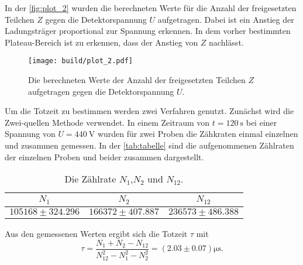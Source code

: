 In der \autoref{fig:plot_2} wurden die berechneten Werte für die Anzahl der freigesetzten Teilchen $Z$ gegen die Detektorspannung $U$
aufgetragen. Dabei ist ein Anstieg der Ladungsträger proportional zur Spannung erkennen. In dem vorher bestimmten
Plateau-Bereich ist zu erkennen, dass der Anstieg von $Z$ nachlässt.

\begin{figure}[H]
	\texttt{[image: build/plot\_2.pdf]}
	\caption{Die berechneten Werte der Anzahl der freigesetzten Teilchen $Z$ aufgetragen gegen die Detektorspannung $U$.}
	\label{fig:plot_2}
\end{figure}

Um die Totzeit zu bestimmen werden zwei Verfahren genutzt. Zunächst wird die Zwei-quellen Methode
verwendet. In einem Zeitraum von $t = \SI{120}{\second}$ bei einer Spannung von $U = \SI{440}{\volt}$ wurden für zwei Proben
die Zähkraten einmal einzelnen und zusammen gemessen.
In der \autoref{tab:tabelle} sind die aufgenommenen Zählraten der einzelnen Proben und beider zusammen dargestellt.

\begin{table}[H]
    \centering
    \caption{Die Zählrate $N_1$,$N_2$ und $N_12$.}
    \label{tab:tabelle}
    \begin{tabular}{c c c}
    \toprule
    $N_1$ & $N_2$ & $N_12$ \\
    \midrule
    $105168 \pm 324.296$ & $166372 \pm 407.887$ &$236573 \pm 486.388$ \\
    \bottomrule
    \end{tabular}
\end{table}

Aus den gemessenen Werten ergibt sich die Totzeit $\tau$ mit
\begin{equation*}
    \tau =\frac{N_1+N_2-N_{12}}{N_{12}^2-N_1^2-N_2^2} = \left(2.03 \pm 0.07\right) \si{\micro\second}.
\end{equation*}
